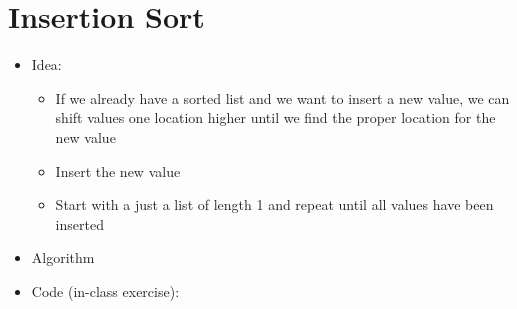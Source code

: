 \documentclass[letterpaper,10pt,english]{sphinxmanual}
\begin{document}
\section{Insertion Sort}
\label{\detokenize{lecture_notes/lec21_sorting:insertion-sort}}\begin{itemize}
\item {} 
Idea:
\begin{itemize}
\item {} 
If we already have a sorted list and we want to insert a new
value, we can shift values one location higher until we find the
proper location for the new value

\item {} 
Insert the new value

\item {} 
Start with a just a list of length 1 and repeat until all values
have been inserted

\end{itemize}

\item {} 
Algorithm

%
\begin{sphinxVerbatim}[commandchars=\\\{\}]
          
             
        
                  
                 
         
            
\end{sphinxVerbatim}

\item {} 
Code (in-class exercise):

%
\begin{sphinxVerbatim}[commandchars=\\\{\}]
 
\end{sphinxVerbatim}

\end{itemize}
\end{document}
